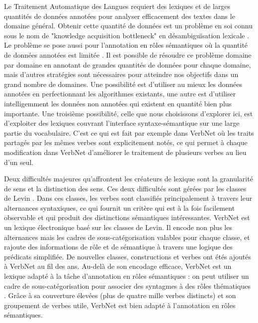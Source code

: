 Le Traitement Automatique des Langues requiert des lexiques et de larges
quantités de données annotées pour analyser efficacement des textes dans le
domaine général. Obtenir cette quantité de données est un problème en soi connu
sous le nom de "knowledge acquisition bottleneck" en désambiguïsation lexicale
\citep{gale1992method,navigli2009word}. Le problème se pose aussi pour
l'annotation en rôles sémantiques où la quantité de données annotées est
limitée \citep[p. 2]{das2012structure}. Il est possible de résoudre ce problème
domaine par domaine en annotant de grandes quantités de données pour chaque
domaine, mais d'autres stratégies sont nécessaires pour atteindre nos objectifs
dans un grand nombre de domaines. Une possibilité est d'utiliser au mieux les
données annotées en perfectionnant les algorithmes existants, une autre est
d'utiliser intelligemment les données non annotées qui existent en quantité
bien plus importante. Une troisième possibilité, celle que nous choisissons
d'explorer ici, est d'exploiter des lexiques couvrant l'interface
syntaxe-sémantique sur une large partie du vocabulaire. C'est ce qui est fait
par exemple dans VerbNet où les traits partagés par les mêmes verbes sont
explicitement notés, ce qui permet à chaque modification dans VerbNet
d'améliorer le traitement de plusieurs verbes au lieu d'un seul.

Deux difficultés majeures qu'affrontent les créateurs de lexique sont la
granularité de sens et la distinction des sens. Ces deux difficultés sont
gérées par les classes de Levin \citep{levin1993english}. Dans ces classes, les
verbes sont classifiés principalement à travers leur alternances syntaxiques,
ce qui fournit un critère qui est à la fois facilement observable et qui
produit des distinctions sémantiques intéressantes. VerbNet
\citep{kipperschuler2005verbnet} est un lexique électronique basé sur les
classes de Levin. Il encode non plus les alternances mais les cadres de
sous-catégorisation valables pour chaque classe, et rajoute des informations de
rôle et de sémantique à travers une logique des prédicats simplifiée. De
nouvelles classes, constructions et verbes ont étés ajoutés à VerbNet au fil
des ans. Au-delà de son encodage efficace, VerbNet est un lexique adapté à la
tâche d'annotation en rôles sémantiques : on peut utiliser un cadre de
sous-catégorisation pour associer des syntagmes à des rôles thématiques
\citep{swier2005exploiting,pradet2013revisiting}. Grâce à sa couverture élevées
(plus de quatre mille verbes distincts) et son groupement de verbes utile,
VerbNet est bien adapté à l'annotation en rôles sémantiques.

